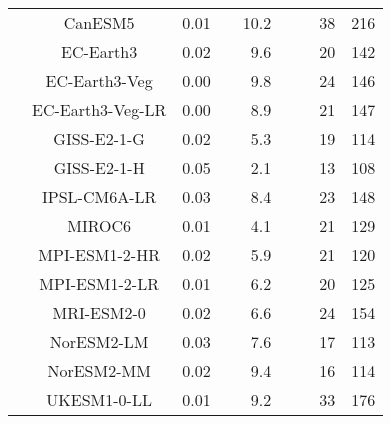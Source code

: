 \begin{table*}[t]
\begin{tabular}{c|c|rr|rr|rrr}
 & CanESM5 & 0.01 &  & 10.2 &  &  & 38 & 216 \\
 & EC-Earth3 & 0.02 &  & 9.6 &  &  & 20 & 142 \\
 & EC-Earth3-Veg & 0.00 &  & 9.8 &  &  & 24 & 146 \\
 & EC-Earth3-Veg-LR & 0.00 &  & 8.9 &  &  & 21 & 147 \\
 & GISS-E2-1-G & 0.02 &  & 5.3 &  &  & 19 & 114 \\
 & GISS-E2-1-H & 0.05 &  & 2.1 &  &  & 13 & 108 \\
 & IPSL-CM6A-LR & 0.03 &  & 8.4 &  &  & 23 & 148 \\
 & MIROC6 & 0.01 &  & 4.1 &  &  & 21 & 129 \\
 & MPI-ESM1-2-HR & 0.02 &  & 5.9 &  &  & 21 & 120 \\
 & MPI-ESM1-2-LR & 0.01 &  & 6.2 &  &  & 20 & 125 \\
 & MRI-ESM2-0 & 0.02 &  & 6.6 &  &  & 24 & 154 \\
 & NorESM2-LM & 0.03 &  & 7.6 &  &  & 17 & 113 \\
 & NorESM2-MM & 0.02 &  & 9.4 &  &  & 16 & 114 \\
 & UKESM1-0-LL & 0.01 &  & 9.2 &  &  & 33 & 176 \\
\cline{1-9}
\bottomrule
\end{tabular}
\end{table*}
